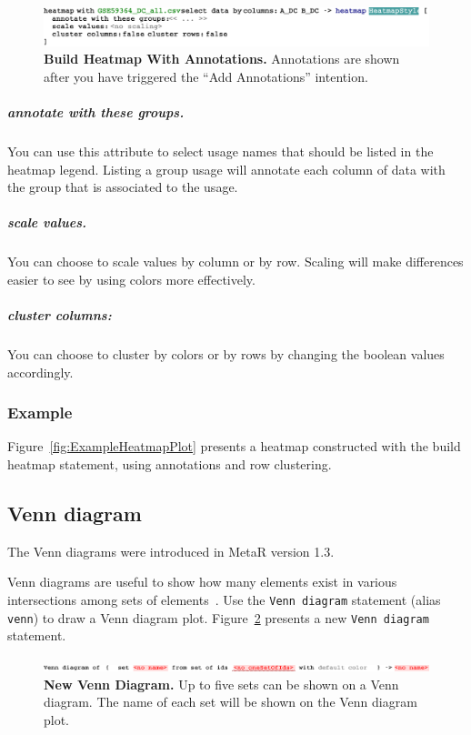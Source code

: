 \begin{figure}[h!tbp]
  \centering
  \includegraphics[width=\figWidthWide]{figures/NewBuildHeatmapWithAnnotations.pdf}
\caption[Heatmap With Annotations.]{\textbf{Build Heatmap With Annotations.} Annotations are shown after you have triggered the ``Add Annotations'' intention.}
\label{fig:BuildHeatmapWithAnnotations}
\end{figure}

\subparagraph{\textbf{annotate with these groups.}} You can use this attribute to select usage names that should be listed in the heatmap legend. Listing a group usage will annotate each column of data with the group that is associated to the usage.
\subparagraph{\textbf{scale values.}} You can choose to scale values by column or by row. Scaling will make differences easier to see by using colors more effectively.
\subparagraph{\textbf{cluster columns:}} You can choose to cluster by colors or by rows by changing the boolean values accordingly.

\subsubsection{Example}

Figure~\ref{fig:ExampleHeatmapPlot} presents a heatmap constructed with the build heatmap statement, using annotations and row clustering. 

\subsection{Venn diagram}\label{subsec:VennDiagram}
\begin{remark}
The Venn diagrams were introduced in MetaR version 1.3.
\end{remark}

Venn diagrams are useful to show how many elements exist in various intersections among sets of elements~\cite{venn1880diagrammatic}.  Use the \texttt{Venn diagram} statement (alias \texttt{venn}) to draw a Venn diagram plot. Figure~\ref{fig:NewVennDiagram} presents a new \texttt{Venn diagram} statement. 


\begin{figure}[h!tbp]
  \centering
  \includegraphics[width=\figWidthWide]{figures/NewBuildVennDiagram.pdf}
\caption[New Venn Diagram.]{\textbf{New Venn Diagram.} Up to five sets can be shown on a Venn diagram. The name of each set will be shown on the Venn diagram plot.}
\label{fig:NewVennDiagram}
\end{figure}

